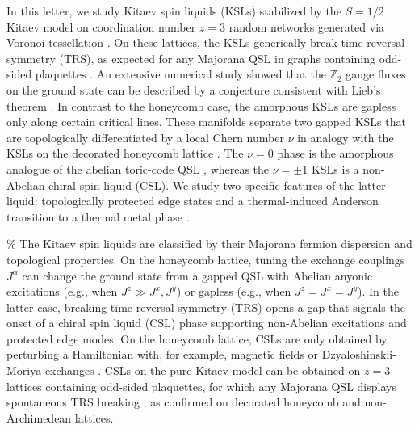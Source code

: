 In this letter, we study Kitaev spin liquids (KSLs) stabilized by the
\(S=1/2\) Kitaev model \cite{kitaevAnyonsExactlySolved2006} on
coordination number \(z=3\) random networks generated via Voronoi
tessellation
\cite{mitchellAmorphousTopologicalInsulators2018,marsalTopologicalWeaireThorpeModels2020}.
On these lattices, the KSLs generically break time-reversal symmetry
(TRS), as expected for any Majorana QSL in graphs containing odd-sided
plaquettes
\cite{Chua2011,ChuaPRB2011,Fiete2012,Natori2016,Wu2009, WangHaoranPRB2021}.
An extensive numerical study showed that the \(\mathbb Z_2\) gauge
fluxes on the ground state can be described by a conjecture consistent
with Lieb's theorem \cite{lieb_flux_1994}. In contrast to the honeycomb
case, the amorphous KSLs are gapless only along certain critical lines.
These manifolds separate two gapped KSLs that are topologically
differentiated by a local Chern number \(\nu\)
\cite{peru_preprint, mitchellAmorphousTopologicalInsulators2018} in
analogy with the KSLs on the decorated honeycomb lattice
\cite{yaoExactChiralSpin2007}. The \(\nu=0\) phase is the amorphous
analogue of the abelian toric-code QSL
\cite{kitaev_fault-tolerant_2003}, whereas the \(\nu=\pm1\) KSLs is a
non-Abelian chiral spin liquid (CSL). We study two specific features of
the latter liquid: topologically protected edge states and a
thermal-induced Anderson transition to a thermal metal phase
\cite{selfThermallyInducedMetallic2019}.

\par

\% The Kitaev spin liquids are classified by their Majorana fermion
dispersion and topological properties. On the honeycomb lattice, tuning
the exchange couplings \(J^\alpha\) can change the ground state from a
gapped QSL with Abelian anyonic excitations (e.g., when
\(J^z\gg J^x,J^y\)) or gapless (e.g., when \(J^z=J^x=J^y\)). In the
latter case, breaking time reversal symmetry (TRS) opens a gap that
signals the onset of a chiral spin liquid (CSL) phase supporting
non-Abelian excitations and protected edge modes. On the honeycomb
lattice, CSLs are only obtained by perturbing a Hamiltonian with, for
example, magnetic fields \cite{kitaevAnyonsExactlySolved2006} or
Dzyaloshinskii-Moriya exchanges \cite{Ralko2020}. CSLs on the pure
Kitaev model can be obtained on \(z=3\) lattices containing odd-sided
plaquettes, for which any Majorana QSL displays spontaneous TRS breaking
\cite{Chua2011,ChuaPRB2011,Fiete2012,Natori2016,Wu2009, WangHaoranPRB2021},
as confirmed on decorated honeycomb \cite{yaoExactChiralSpin2007} and
non-Archimedean \cite{Peri2020} lattices.

